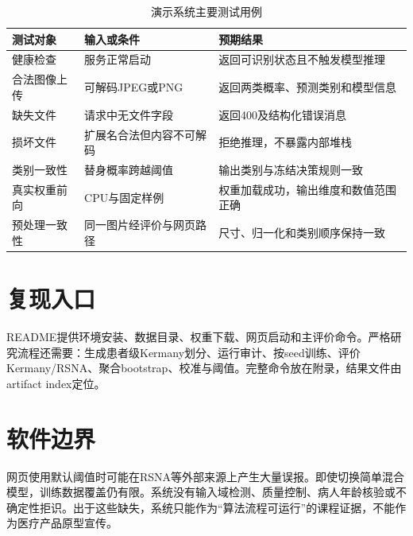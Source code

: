 \begin{table}[H]
\centering
\caption{演示系统主要测试用例}
\begin{tabularx}{\textwidth}{p{}p{}X}
\toprule
测试对象 & 输入或条件 & 预期结果 \\
\midrule
健康检查 & 服务正常启动 & 返回可识别状态且不触发模型推理 \\
合法图像上传 & 可解码JPEG或PNG & 返回两类概率、预测类别和模型信息 \\
缺失文件 & 请求中无文件字段 & 返回400及结构化错误消息 \\
损坏文件 & 扩展名合法但内容不可解码 & 拒绝推理，不暴露内部堆栈 \\
类别一致性 & 替身概率跨越阈值 & 输出类别与冻结决策规则一致 \\
真实权重前向 & CPU与固定样例 & 权重加载成功，输出维度和数值范围正确 \\
预处理一致性 & 同一图片经评价与网页路径 & 尺寸、归一化和类别顺序保持一致 \\
\bottomrule
\end{tabularx}
\end{table}

\section{复现入口}

README提供环境安装、数据目录、权重下载、网页启动和主评价命令。严格研究流程还需要：生成患者级Kermany划分、运行审计、按seed训练、评价Kermany/RSNA、聚合bootstrap、校准与阈值。完整命令放在附录，结果文件由artifact index定位。

\section{软件边界}

网页使用默认阈值时可能在RSNA等外部来源上产生大量误报。即使切换简单混合模型，训练数据覆盖仍有限。系统没有输入域检测、质量控制、病人年龄核验或不确定性拒识。出于这些缺失，系统只能作为“算法流程可运行”的课程证据，不能作为医疗产品原型宣传。

